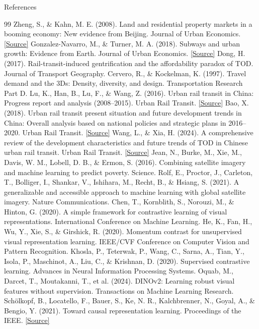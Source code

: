 \documentclass[aspectratio=169,11pt]{beamer}
\begin{document}
\begin{frame}[allowframebreaks]{References}
\begin{thebibliography}{99}
     Zheng, S., \& Kahn, M. E. (2008). Land and residential property markets in a booming economy: New evidence from Beijing. Journal of Urban Economics. \href{https://doi.org/10.1016/j.jue.2007.04.010}{[Source]}
     Gonzalez-Navarro, M., \& Turner, M. A. (2018). Subways and urban growth: Evidence from Earth. Journal of Urban Economics. \href{https://www.nber.org/papers/w24996}{[Source]}
     Dong, H. (2017). Rail-transit-induced gentrification and the affordability paradox of TOD. Journal of Transport Geography.
     Cervero, R., \& Kockelman, K. (1997). Travel demand and the 3Ds: Density, diversity, and design. Transportation Research Part D.
     Lu, K., Han, B., Lu, F., \& Wang, Z. (2016). Urban rail transit in China: Progress report and analysis (2008--2015). Urban Rail Transit. \href{https://doi.org/10.1007/s40864-016-0048-7}{[Source]}
     Bao, X. (2018). Urban rail transit present situation and future development trends in China: Overall analysis based on national policies and strategic plans in 2016--2020. Urban Rail Transit. \href{https://doi.org/10.1007/s40864-018-0078-4}{[Source]}
     Wang, L., \& Xia, H. (2024). A comprehensive review of the development characteristics and future trends of TOD in Chinese urban rail transit. Urban Rail Transit. \href{https://doi.org/10.1007/s40864-024-00228-2}{[Source]}
     Jean, N., Burke, M., Xie, M., Davis, W. M., Lobell, D. B., \& Ermon, S. (2016). Combining satellite imagery and machine learning to predict poverty. Science.
     Rolf, E., Proctor, J., Carleton, T., Bolliger, I., Shankar, V., Ishihara, M., Recht, B., \& Hsiang, S. (2021). A generalizable and accessible approach to machine learning with global satellite imagery. Nature Communications.
     Chen, T., Kornblith, S., Norouzi, M., \& Hinton, G. (2020). A simple framework for contrastive learning of visual representations. International Conference on Machine Learning.
     He, K., Fan, H., Wu, Y., Xie, S., \& Girshick, R. (2020). Momentum contrast for unsupervised visual representation learning. IEEE/CVF Conference on Computer Vision and Pattern Recognition.
     Khosla, P., Teterwak, P., Wang, C., Sarna, A., Tian, Y., Isola, P., Maschinot, A., Liu, C., \& Krishnan, D. (2020). Supervised contrastive learning. Advances in Neural Information Processing Systems.
     Oquab, M., Darcet, T., Moutakanni, T., et al. (2024). DINOv2: Learning robust visual features without supervision. Transactions on Machine Learning Research.
     Sch\"olkopf, B., Locatello, F., Bauer, S., Ke, N. R., Kalchbrenner, N., Goyal, A., \& Bengio, Y. (2021). Toward causal representation learning. Proceedings of the IEEE. \href{https://arxiv.org/abs/2102.11107}{[Source]}


\end{thebibliography}
\end{frame}
\end{document}
